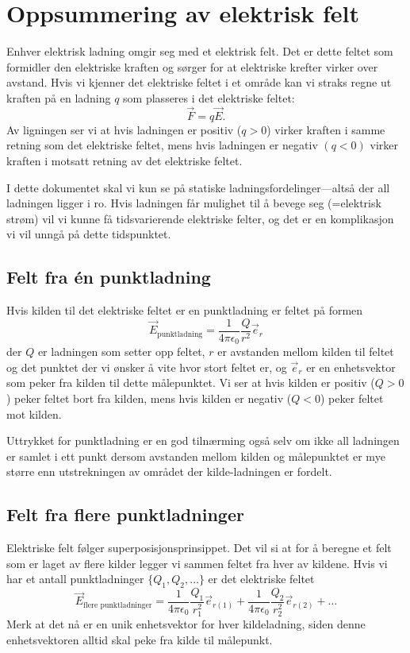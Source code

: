 \documentclass[a4paper,norsk,12pt]{article}
\begin{document}
\section*{Oppsummering av elektrisk felt}
Enhver elektrisk ladning omgir seg med et elektrisk felt. Det er dette feltet som formidler den elektriske kraften og sørger for at elektriske krefter virker over avstand. Hvis vi kjenner det elektriske feltet i et område kan vi straks regne ut kraften på en ladning $q$ som plasseres i det elektriske feltet:
\begin{displaymath}
	\vec{F} = q\vec{E}.
\end{displaymath}
Av ligningen ser vi at hvis ladningen er positiv ($q>0$) virker kraften i samme retning som det elektriske feltet, mens hvis ladningen er negativ $(q<0)$ virker kraften i motsatt retning av det elektriske feltet.

I dette dokumentet skal vi kun se på statiske ladningsfordelinger---altså der all ladningen ligger i ro. Hvis ladningen får mulighet til å bevege seg (=elektrisk strøm) vil vi kunne få tidsvarierende elektriske felter, og det er en komplikasjon vi vil unngå på dette tidspunktet.

\subsection*{Felt fra \'en punktladning}
Hvis kilden til det elektriske feltet er en punktladning er feltet på formen
\begin{displaymath}
	\vec{E}_\text{punktladning} = \frac{1}{4\pi\epsilon_0}\frac{Q}{r^2}\vec{e}_r
\end{displaymath}
der $Q$ er ladningen som setter opp feltet, $r$ er avstanden mellom kilden til feltet og det punktet der vi ønsker å vite hvor stort feltet er, og $\vec{e}_r$ er en enhetsvektor som peker fra kilden til dette målepunktet. Vi ser at hvis kilden er positiv ($Q>0$) peker feltet bort fra kilden, mens hvis kilden er negativ ($Q<0$) peker feltet mot kilden.

Uttrykket for punktladning er en god tilnærming også selv om ikke all ladningen er samlet i ett punkt dersom avstanden mellom kilden og målepunktet er mye større enn utstrekningen av området der kilde-ladningen er fordelt.

\subsection*{Felt fra flere punktladninger}
Elektriske felt følger superposisjonsprinsippet. Det vil si at for å beregne et felt som er laget av flere kilder legger vi sammen feltet fra hver av kildene. Hvis vi har et antall punktladninger $\{Q_1, Q_2, \ldots\}$ er det elektriske feltet
\begin{displaymath}
	\vec{E}_\text{flere punktladninger} = \frac{1}{4\pi\epsilon_0}\frac{Q_1}{r_1^2}\vec{e}_{r(1)} + \frac{1}{4\pi\epsilon_0}\frac{Q_2}{r_2^2}\vec{e}_{r(2)} + \ldots
\end{displaymath}
Merk at det nå er en unik enhetsvektor for hver kildeladning, siden denne enhetsvektoren alltid skal peke fra kilde til målepunkt.
\end{document}
